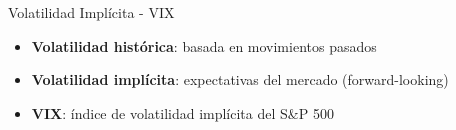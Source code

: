 \begin{frame}{Volatilidad Implícita - VIX}
    \begin{itemize}
        \item<1-> \textbf{Volatilidad histórica}: basada en movimientos pasados
        \item<2-> \textbf{Volatilidad implícita}: expectativas del mercado (forward-looking)
        \item<3-> \textbf{VIX}: índice de volatilidad implícita del S\&P 500
    \end{itemize}
    
    \vspace{0.5em}
    
    
    \vspace{0.5em}
    
\end{frame}